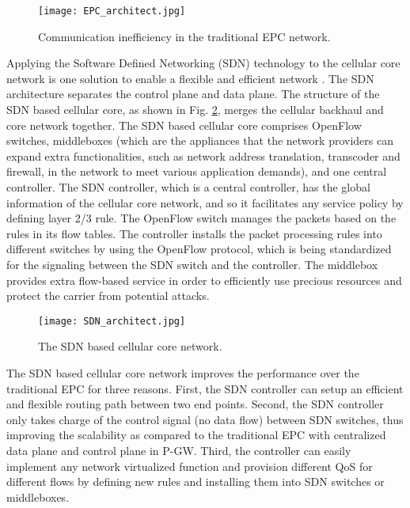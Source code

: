 \documentclass[journal,12pt,draftclsnofoot,onecolumn]{IEEEtran}
\begin{document}
\begin{figure}[!htb]
	\centering	
\texttt{[image: EPC\_architect.jpg]}
	\caption{Communication inefficiency in the traditional EPC network.}	
	\label{fig:EPC_architect}
\end{figure}

Applying the Software Defined Networking (SDN) technology to the cellular core network is one solution to enable a flexible and efficient network \cite{8,8.1}. The SDN architecture separates the control plane and data plane. The structure of the SDN based cellular core, as shown in Fig. \ref{fig:SDN_architect}, merges the cellular backhaul and core network together. The SDN based cellular core comprises OpenFlow switches, middleboxes (which are the appliances that the network providers can expand extra functionalities, such as network address translation, transcoder and firewall, in the network to meet various application demands), and one central controller. The SDN controller, which is a central controller, has the global information of the cellular core network, and so it facilitates any service policy by defining layer 2/3 rule. The OpenFlow switch manages the packets based on the rules in its flow tables. The controller installs the packet processing rules into different switches by using the OpenFlow protocol, which is being standardized for the signaling between the SDN switch and the controller. The middlebox provides extra flow-based service in order to efficiently use precious resources and protect the carrier from potential attacks.

\begin{figure}[!htb]
	\centering	
\texttt{[image: SDN\_architect.jpg]}
	\caption{The SDN based cellular core network.}	
	\label{fig:SDN_architect}
\end{figure}

The SDN based cellular core network improves the performance over the traditional EPC for three reasons. First, the SDN controller can setup an efficient and flexible routing path between two end points. Second, the SDN controller only takes charge of the control signal (no data flow) between SDN switches, thus improving the scalability as compared to the traditional EPC with centralized data plane and control plane in P-GW. Third, the controller can easily implement any network virtualized function and provision different QoS for different flows by defining new rules and installing them into SDN switches or middleboxes.
\end{document}
